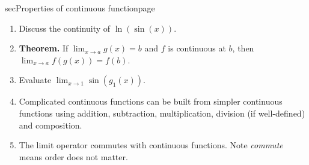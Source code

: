 \documentclass[../main]{subfiles}
\begin{document}
\begin{outline}{sec}{Properties of continuous function}{page}
\begin{enumerate}
    \item Discuss the continuity of \(\ln\left( \sin(x) \right)\).

    \item \textbf{Theorem.} If \(\lim_{x \to a} g(x) = b\) and \(f\) is continuous at \(b\), then \(\lim_{x \to a} f(g(x)) = f(b)\).

    \item Evaluate \(\lim_{x \to 1} \sin(g_{1}(x))\).

    \item {Complicated continuous functions can be built from simpler continuous functions using addition, subtraction, multiplication, division (if well-defined) and composition.}
    \item {The limit operator commutes with continuous functions. Note \emph{commute} means order does not matter.}
  \end{enumerate}
\end{outline}
\end{document}
